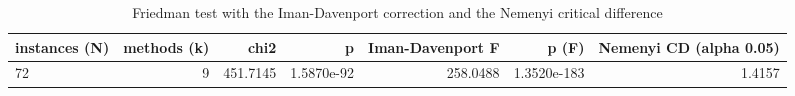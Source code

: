 \begin{table}[htbp]
\centering
\small
\caption{Friedman test with the Iman-Davenport correction and the Nemenyi critical difference}
\label{tab:E4b_equal_budgets_60s_b60_friedman_test}
\begin{tabular}{lrrrrrr}
\toprule
instances (N) & methods (k) & chi2 & p & Iman-Davenport F & p (F) & Nemenyi CD (alpha 0.05) \\
\midrule
72 & 9 & 451.7145 & 1.5870e-92 & 258.0488 & 1.3520e-183 & 1.4157 \\
\bottomrule
\end{tabular}
\end{table}

